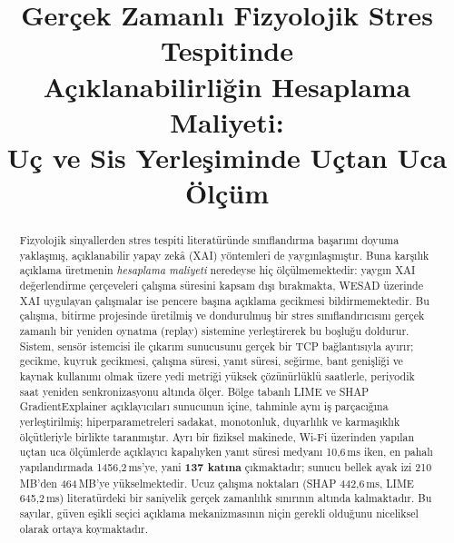 \documentclass[conference]{IEEEtran}
\newcommand{\kapatKisayol}{\shorthandoff{=:!}}
\newcommand{\ms}{\,ms\xspace}
\begin{document}
\kapatKisayol

\title{Gerçek Zamanlı Fizyolojik Stres Tespitinde\\
Açıklanabilirliğin Hesaplama Maliyeti:\\
Uç ve Sis Yerleşiminde Uçtan Uca Ölçüm}

\author{%
\and
{}
\and
{}
}

\maketitle

\begin{abstract}
Fizyolojik sinyallerden stres tespiti literatüründe sınıflandırma başarımı
doyuma yaklaşmış, açıklanabilir yapay zekâ (XAI) yöntemleri de yaygınlaşmıştır.
Buna karşılık açıklama üretmenin \emph{hesaplama maliyeti} neredeyse hiç
ölçülmemektedir: yaygın XAI değerlendirme çerçeveleri çalışma süresini kapsam
dışı bırakmakta, WESAD üzerinde XAI uygulayan çalışmalar ise pencere başına
açıklama gecikmesi bildirmemektedir. Bu çalışma, bitirme projesinde üretilmiş
ve dondurulmuş bir stres sınıflandırıcısını gerçek zamanlı bir yeniden oynatma
(replay) sistemine yerleştirerek bu boşluğu doldurur. Sistem, sensör istemcisi
ile çıkarım sunucusunu gerçek bir TCP bağlantısıyla ayırır; gecikme, kuyruk
gecikmesi, çalışma süresi, yanıt süresi, seğirme, bant genişliği ve kaynak
kullanımı olmak üzere yedi metriği yüksek çözünürlüklü saatlerle, periyodik
saat yeniden senkronizasyonu altında ölçer. Bölge tabanlı LIME ve SHAP
GradientExplainer açıklayıcıları sunucunun içine, tahminle aynı iş parçacığına
yerleştirilmiş; hiperparametreleri sadakat, monotonluk, duyarlılık ve
karmaşıklık ölçütleriyle birlikte taranmıştır. Ayrı bir fiziksel makinede,
Wi-Fi üzerinden yapılan uçtan uca ölçümlerde açıklayıcı kapalıyken yanıt süresi
medyanı 10{,}6\ms iken, en pahalı yapılandırmada 1456{,}2\ms'ye, yani
\textbf{137 katına} çıkmaktadır; sunucu bellek ayak izi 210\,MB'den 464\,MB'ye
yükselmektedir. Ucuz çalışma noktaları (SHAP 442{,}6\ms, LIME 645{,}2\ms)
literatürdeki bir saniyelik gerçek zamanlılık sınırının altında kalmaktadır. Bu
sayılar, güven eşikli seçici açıklama mekanizmasının niçin gerekli olduğunu
niceliksel olarak ortaya koymaktadır.
\end{abstract}
\end{document}
